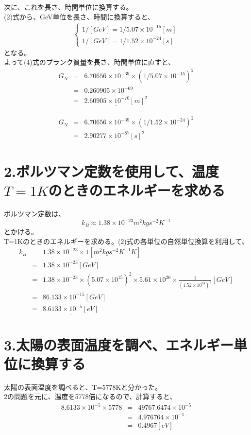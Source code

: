 \documentclass[10pt]{jreport}
\begin{document}
次に、これを長さ、時間単位に換算する。\\
(2)式から、GeV単位を長さ、時間に換算すると、
\begin{eqnarray}
\left \{ \begin{array}{ll}
	1/[GeV] = 1/5.07\times 10^{-15} [m] \\
	1/[GeV] = 1/1.52 \times 10^{-24} [s] 
\end{array} \right.
\end{eqnarray}
となる。\\
よって(4)式のプランク質量を長さ、時間単位に直すと、
\begin{eqnarray}
G_N &=& 6.70656 \times 10^{-39} \times (1/5.07\times10^{-15})^2 \nonumber \\
&=& 0.260905 \times 10^{-69} \nonumber \\
&=& \underline{2.60905 \times 10^{-70} [m]^2}
\end{eqnarray}

\begin{eqnarray}
G_N &=& 6.70656 \times10^{-39}\times (1/1.52\times10^{-24})^2 \nonumber \\
&=& \underline{2.90277 \times 10^{-87} [s]^2}
\end{eqnarray}

\section*{2.ボルツマン定数を使用して、温度$T=1K$のときのエネルギーを求める}
ボルツマン定数は、
\begin{equation}
k_B \approx 1.38\times10^{-23} m^2kgs^{-2}K^{-1}
\end{equation}
とかける。\\
T=1Kのときのエネルギーを求める。(2)式の各単位の自然単位換算を利用して、\\
\begin{eqnarray}
k_B &=& 1.38\times10^{-23} \times 1 [m^2kgs^{-2}K^{-1}K] \nonumber \\
&=& 1.38\times10^{-23} [GeV] \nonumber \\
&=& 1.38 \times 10^{-23} \times (5.07 \times10^{15})^2 \times 5.61 \times 10^{26} \times \frac{1}{(1.52\times 10^{24})^2} [GeV] \nonumber \\
&=& 86.133  \times 10^{-15} [GeV] \nonumber \\
&=&  \underline{8.6133 \times 10^{-5} [eV]}
\end{eqnarray}

\section*{3.太陽の表面温度を調べ、エネルギー単位に換算する}
太陽の表面温度を調べると、T=5778Kと分かった。\\
2の問題を元に、温度を5778倍になるので、計算すると、
\begin{eqnarray}
8.6133 \times 10^{-5} \times 5778 &=& 49767.6474 \times 10^{-5} \nonumber \\
&=& 4.976764 \times 10^{-1} \nonumber \\
&=& \underline{0.4967 [eV]}
\end{eqnarray}
\end{document}
